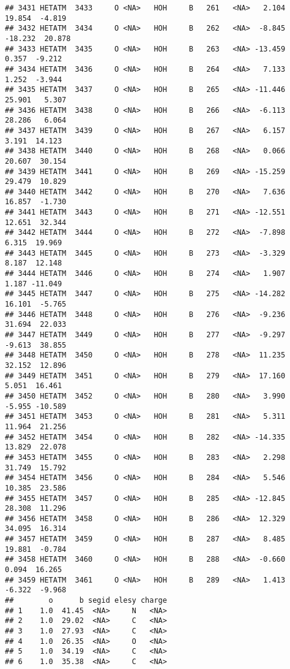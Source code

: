 \documentclass[
]{article}
\begin{document}
\begin{verbatim}
## 3431 HETATM  3433     O <NA>   HOH     B   261   <NA>   2.104  19.854  -4.819
## 3432 HETATM  3434     O <NA>   HOH     B   262   <NA>  -8.845 -18.232  20.878
## 3433 HETATM  3435     O <NA>   HOH     B   263   <NA> -13.459   0.357  -9.212
## 3434 HETATM  3436     O <NA>   HOH     B   264   <NA>   7.133   1.252  -3.944
## 3435 HETATM  3437     O <NA>   HOH     B   265   <NA> -11.446  25.901   5.307
## 3436 HETATM  3438     O <NA>   HOH     B   266   <NA>  -6.113  28.286   6.064
## 3437 HETATM  3439     O <NA>   HOH     B   267   <NA>   6.157   3.191  14.123
## 3438 HETATM  3440     O <NA>   HOH     B   268   <NA>   0.066  20.607  30.154
## 3439 HETATM  3441     O <NA>   HOH     B   269   <NA> -15.259  29.479  10.829
## 3440 HETATM  3442     O <NA>   HOH     B   270   <NA>   7.636  16.857  -1.730
## 3441 HETATM  3443     O <NA>   HOH     B   271   <NA> -12.551  12.651  32.344
## 3442 HETATM  3444     O <NA>   HOH     B   272   <NA>  -7.898   6.315  19.969
## 3443 HETATM  3445     O <NA>   HOH     B   273   <NA>  -3.329   8.187  12.148
## 3444 HETATM  3446     O <NA>   HOH     B   274   <NA>   1.907   1.187 -11.049
## 3445 HETATM  3447     O <NA>   HOH     B   275   <NA> -14.282  16.101  -5.765
## 3446 HETATM  3448     O <NA>   HOH     B   276   <NA>  -9.236  31.694  22.033
## 3447 HETATM  3449     O <NA>   HOH     B   277   <NA>  -9.297  -9.613  38.855
## 3448 HETATM  3450     O <NA>   HOH     B   278   <NA>  11.235  32.152  12.896
## 3449 HETATM  3451     O <NA>   HOH     B   279   <NA>  17.160   5.051  16.461
## 3450 HETATM  3452     O <NA>   HOH     B   280   <NA>   3.990  -5.955 -10.589
## 3451 HETATM  3453     O <NA>   HOH     B   281   <NA>   5.311  11.964  21.256
## 3452 HETATM  3454     O <NA>   HOH     B   282   <NA> -14.335  13.829  22.078
## 3453 HETATM  3455     O <NA>   HOH     B   283   <NA>   2.298  31.749  15.792
## 3454 HETATM  3456     O <NA>   HOH     B   284   <NA>   5.546  10.385  23.586
## 3455 HETATM  3457     O <NA>   HOH     B   285   <NA> -12.845  28.308  11.296
## 3456 HETATM  3458     O <NA>   HOH     B   286   <NA>  12.329  34.095  16.314
## 3457 HETATM  3459     O <NA>   HOH     B   287   <NA>   8.485  19.881  -0.784
## 3458 HETATM  3460     O <NA>   HOH     B   288   <NA>  -0.660   0.094  16.265
## 3459 HETATM  3461     O <NA>   HOH     B   289   <NA>   1.413  -6.322  -9.968
##        o      b segid elesy charge
## 1    1.0  41.45  <NA>     N   <NA>
## 2    1.0  29.02  <NA>     C   <NA>
## 3    1.0  27.93  <NA>     C   <NA>
## 4    1.0  26.35  <NA>     O   <NA>
## 5    1.0  34.19  <NA>     C   <NA>
## 6    1.0  35.38  <NA>     C   <NA>

\end{verbatim}
\end{document}
